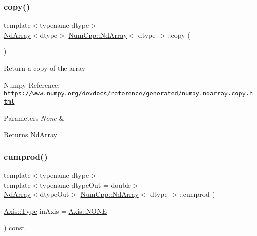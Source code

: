 \subsubsection{\texorpdfstring{copy()}{copy()}}
{\footnotesize\ttfamily template$<$typename dtype$>$ \\
\mbox{\hyperlink{class_num_cpp_1_1_nd_array}{Nd\+Array}}$<$dtype$>$ \mbox{\hyperlink{class_num_cpp_1_1_nd_array}{Num\+Cpp\+::\+Nd\+Array}}$<$ dtype $>$\+::copy (\begin{DoxyParamCaption}{ }\end{DoxyParamCaption})\hspace{0.3cm}{\ttfamily [inline]}}

Return a copy of the array

Numpy Reference\+: \href{https://www.numpy.org/devdocs/reference/generated/numpy.ndarray.copy.html}{\tt https\+://www.\+numpy.\+org/devdocs/reference/generated/numpy.\+ndarray.\+copy.\+html}


\begin{DoxyParams}{Parameters}
{\em None} & \\
\hline
\end{DoxyParams}
\begin{DoxyReturn}{Returns}
\mbox{\hyperlink{class_num_cpp_1_1_nd_array}{Nd\+Array}} 
\end{DoxyReturn}
\mbox{\label{class_num_cpp_1_1_nd_array_a7c1b8059331233f74df6fde8d2e341cd}} 
\subsubsection{\texorpdfstring{cumprod()}{cumprod()}}
{\footnotesize\ttfamily template$<$typename dtype$>$ \\
template$<$typename dtype\+Out  = double$>$ \\
\mbox{\hyperlink{class_num_cpp_1_1_nd_array}{Nd\+Array}}$<$dtype\+Out$>$ \mbox{\hyperlink{class_num_cpp_1_1_nd_array}{Num\+Cpp\+::\+Nd\+Array}}$<$ dtype $>$\+::cumprod (\begin{DoxyParamCaption}\item[{\mbox{\hyperlink{struct_num_cpp_1_1_axis_ac10eb76f8631762d9ed70c40c42ca6cb}{Axis\+::\+Type}}}]{in\+Axis = {\ttfamily \mbox{\hyperlink{struct_num_cpp_1_1_axis_ac10eb76f8631762d9ed70c40c42ca6cba747ae657022cca1d87702b56d0c038e9}{Axis\+::\+N\+O\+NE}}} }\end{DoxyParamCaption}) const\hspace{0.3cm}{\ttfamily [inline]}}

